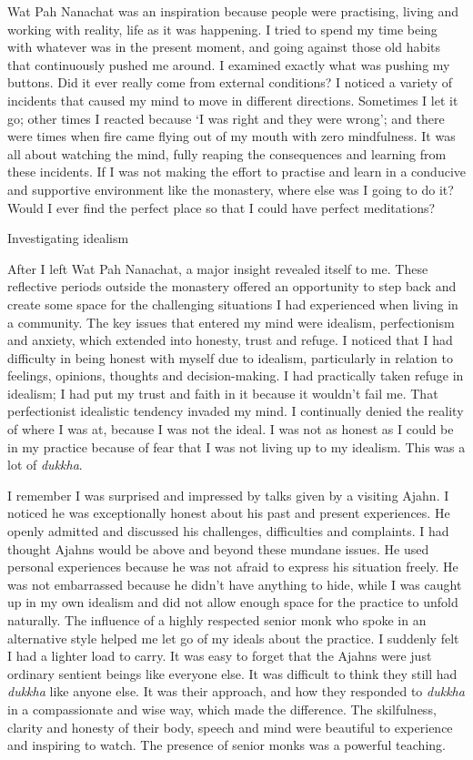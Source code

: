 Wat Pah Nanachat was an inspiration because people were practising,
living and working with reality, life as it was happening. I tried to
spend my time being with whatever was in the present moment, and going
against those old habits that continuously pushed me around. I examined
exactly what was pushing my buttons. Did it ever really come from
external conditions? I noticed a variety of incidents that caused my
mind to move in different directions. Sometimes I let it go; other times
I reacted because `I was right and they were wrong'; and there were
times when fire came flying out of my mouth with zero mindfulness. It
was all about watching the mind, fully reaping the consequences and
learning from these incidents. If I was not making the effort to
practise and learn in a conducive and supportive environment like the
monastery, where else was I going to do it? Would I ever find the
perfect place so that I could have perfect meditations?

Investigating idealism

After I left Wat Pah Nanachat, a major insight revealed itself to me.
These reflective periods outside the monastery offered an opportunity to
step back and create some space for the challenging situations I had
experienced when living in a community. The key issues that entered my
mind were idealism, perfectionism and anxiety, which extended into
honesty, trust and refuge. I noticed that I had difficulty in being
honest with myself due to idealism, particularly in relation to
feelings, opinions, thoughts and decision-making. I had practically
taken refuge in idealism; I had put my trust and faith in it because it
wouldn't fail me. That perfectionist idealistic tendency invaded my
mind. I continually denied the reality of where I was at, because I was
not the ideal. I was not as honest as I could be in my practice because
of fear that I was not living up to my idealism. This was a lot of
\emph{dukkha}.

I remember I was surprised and impressed by talks given by a visiting
Ajahn. I noticed he was exceptionally honest about his past and present
experiences. He openly admitted and discussed his challenges,
difficulties and complaints. I had thought Ajahns would be above and
beyond these mundane issues. He used personal experiences because he was
not afraid to express his situation freely. He was not embarrassed
because he didn't have anything to hide, while I was caught up in my own
idealism and did not allow enough space for the practice to unfold
naturally. The influence of a highly respected senior monk who spoke in
an alternative style helped me let go of my ideals about the practice. I
suddenly felt I had a lighter load to carry. It was easy to forget that
the Ajahns were just ordinary sentient beings like everyone else. It was
difficult to think they still had \emph{dukkha} like anyone else. It was
their approach, and how they responded to \emph{dukkha} in a
compassionate and wise way, which made the difference. The skilfulness,
clarity and honesty of their body, speech and mind were beautiful to
experience and inspiring to watch. The presence of senior monks was a
powerful teaching.

